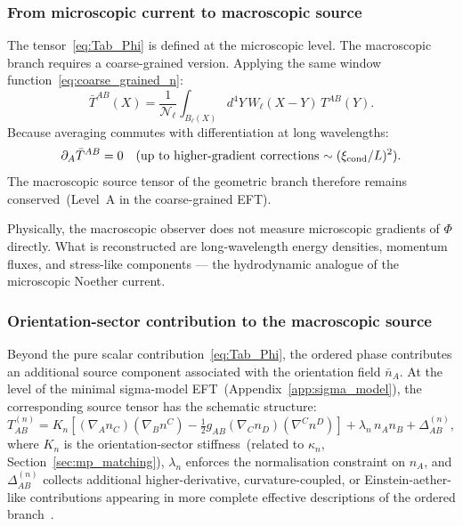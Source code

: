 \subsubsection*{From microscopic current to macroscopic source}

The tensor~\eqref{eq:Tab_Phi} is defined at the microscopic level.
The macroscopic branch requires a coarse-grained version.
Applying the same window function~\eqref{eq:coarse_grained_n}:
\begin{equation}
  \label{eq:Tab_coarse}
  \bar{T}^{AB}(X)
  = \frac{1}{\mathcal{N}_\ell}
    \int_{B_\ell(X)}d^4Y\,W_\ell(X-Y)\,T^{AB}(Y).
\end{equation}
Because averaging commutes with differentiation at long wavelengths:
\begin{equation}
  \label{eq:Tab_coarse_cons}
  \partial_A\bar{T}^{AB} = 0
  \quad\text{(up to higher-gradient corrections
  $\sim(\xi_{\rm cond}/L)^2$)}.
\end{equation}
The macroscopic source tensor of the geometric branch therefore remains
conserved~(Level~A in the coarse-grained EFT).

Physically, the macroscopic observer does not measure microscopic
gradients of $\Phi$ directly.
What is reconstructed are long-wavelength energy densities, momentum
fluxes, and stress-like components --- the hydrodynamic analogue of
the microscopic Noether current.

\subsubsection*{Orientation-sector contribution to the macroscopic source}

Beyond the pure scalar contribution~\eqref{eq:Tab_Phi}, the ordered
phase contributes an additional source component associated with the
orientation field $\bar{n}_A$.
At the level of the minimal sigma-model EFT~(Appendix~\ref{app:sigma_model}),
the corresponding source tensor has the schematic structure:
\begin{equation}
  \label{eq:EMT_n}
  T_{AB}^{(n)}
  = K_n\!\left[
    (\nabla_A n_C)(\nabla_B n^C)
    - \tfrac{1}{2}g_{AB}(\nabla_C n_D)(\nabla^C n^D)
  \right]
  + \lambda_n\,n_A n_B
  + \Delta_{AB}^{(n)},
\end{equation}
where $K_n$ is the orientation-sector stiffness~(related to $\kappa_n$,
Section~\ref{sec:mp_matching}), $\lambda_n$ enforces the normalisation
constraint on $n_A$, and $\Delta_{AB}^{(n)}$ collects additional
higher-derivative, curvature-coupled, or Einstein-aether-like
contributions appearing in more complete effective descriptions of
the ordered branch~\cite{Jacobson2004}.

